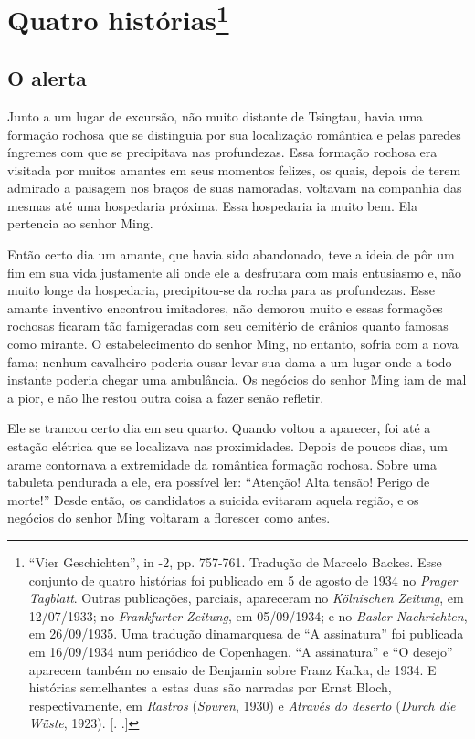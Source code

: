 \chapter{Quatro histórias\footnote[*]{``Vier Geschichten'', in  -2, pp. 757-761.
  Tradução de Marcelo Backes. Esse conjunto de quatro histórias foi
  publicado em 5 de agosto de 1934 no \emph{Prager Tagblatt}. Outras
  publicações, parciais, apareceram no \emph{Kölnischen Zeitung}, em
  12/07/1933; no \emph{Frankfurter Zeitung}, em 05/09/1934; e no
  \emph{Basler Nachrichten}, em 26/09/1935. Uma tradução dinamarquesa de
  ``A assinatura'' foi publicada em 16/09/1934 num periódico de
  Copenhagen. ``A assinatura'' e ``O desejo'' aparecem também no ensaio
  de Benjamin sobre Franz Kafka, de 1934. E histórias semelhantes a
  estas duas são narradas por Ernst Bloch, respectivamente, em
  \emph{Rastros} (\emph{Spuren}, 1930) e \emph{Através do deserto}
  (\emph{Durch die Wüste}, 1923). [. .]} }

\section{O alerta }

Junto a um lugar de excursão, não muito distante de Tsingtau, havia uma
formação rochosa que se distinguia por sua localização romântica e pelas
paredes íngremes com que se precipitava nas profundezas. Essa formação
rochosa era visitada por muitos amantes em seus momentos felizes, os
quais, depois de terem admirado a paisagem nos braços de suas namoradas,
voltavam na companhia das mesmas até uma hospedaria próxima. Essa
hospedaria ia muito bem. Ela pertencia ao senhor Ming.

Então certo dia um amante, que havia sido abandonado, teve a ideia de
pôr um fim em sua vida justamente ali onde ele a desfrutara com mais
entusiasmo e, não muito longe da hospedaria, precipitou-se da rocha para
as profundezas. Esse amante inventivo encontrou imitadores, não demorou
muito e essas formações rochosas ficaram tão famigeradas com seu
cemitério de crânios quanto famosas como mirante. O estabelecimento do
senhor Ming, no entanto, sofria com a nova fama; nenhum cavalheiro
poderia ousar levar sua dama a um lugar onde a todo instante poderia
chegar uma ambulância. Os negócios do senhor Ming iam de mal a pior, e
não lhe restou outra coisa a fazer senão refletir.

Ele se trancou certo dia em seu quarto. Quando voltou a aparecer, foi
até a estação elétrica que se localizava nas proximidades. Depois de
poucos dias, um arame contornava a extremidade da romântica formação
rochosa. Sobre uma tabuleta pendurada a ele, era possível ler:
``Atenção! Alta tensão! Perigo de morte!'' Desde então, os candidatos a
suicida evitaram aquela região, e os negócios do senhor Ming voltaram a
florescer como antes.

